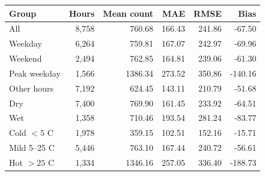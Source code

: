\begin{tabular}{lrrrrr}
\toprule
Group & Hours & Mean count & MAE & RMSE & Bias \\
\midrule
All & 8,758 & 760.68 & 166.43 & 241.86 & -67.50 \\
Weekday & 6,264 & 759.81 & 167.07 & 242.97 & -69.96 \\
Weekend & 2,494 & 762.85 & 164.81 & 239.06 & -61.30 \\
Peak weekday & 1,566 & 1386.34 & 273.52 & 350.86 & -140.16 \\
Other hours & 7,192 & 624.45 & 143.11 & 210.79 & -51.68 \\
Dry & 7,400 & 769.90 & 161.45 & 233.92 & -64.51 \\
Wet & 1,358 & 710.46 & 193.54 & 281.24 & -83.77 \\
Cold $<5$ C & 1,978 & 359.15 & 102.51 & 152.16 & -15.71 \\
Mild 5--25 C & 5,446 & 763.10 & 167.44 & 240.72 & -56.61 \\
Hot $>25$ C & 1,334 & 1346.16 & 257.05 & 336.40 & -188.73 \\
\bottomrule
\end{tabular}
